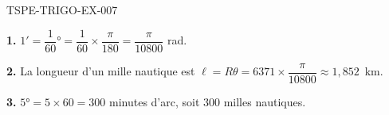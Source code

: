 \begin{corrige}{TSPE-TRIGO-EX-007}

\textbf{1.} $1' = \dfrac{1}{60}° = \dfrac{1}{60} \times \dfrac{\pi}{180} = \dfrac{\pi}{10800}$ rad.

\textbf{2.} La longueur d'un mille nautique est $\ell = R\theta = 6371 \times \dfrac{\pi}{10800} \approx 1{,}852$~km.

\textbf{3.} $5° = 5 \times 60 = 300$ minutes d'arc, soit $300$ milles nautiques.

\end{corrige}
